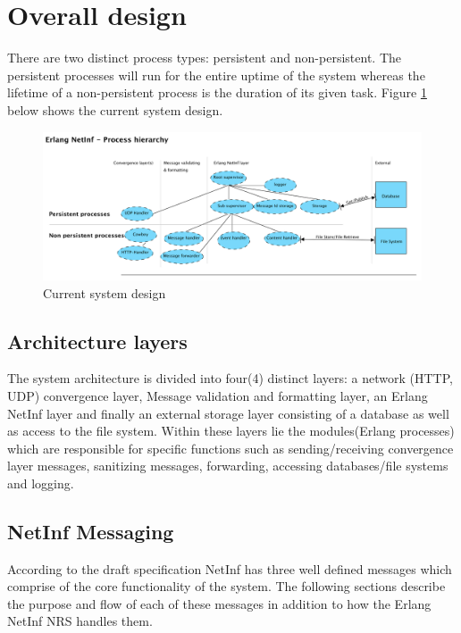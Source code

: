 \section {Overall design}

There are two distinct process types: persistent and non-persistent. The persistent processes will run for the entire uptime of the system whereas the lifetime of a non-persistent process is the duration of its given task. Figure \ref{fig:processhi} below shows the current system design.

\begin{figure}[H]
	\centering
\centerline{\includegraphics[width=1.2\textwidth]{./img/process_hierarchy.png}}
\caption{Current system design}
\label{fig:processhi}
\end{figure}

\subsection{Architecture layers}

The system architecture is divided into four(4) distinct layers: a network (HTTP, UDP) convergence layer, Message validation and formatting layer, an Erlang NetInf layer and finally an external storage layer consisting of a database as well as access to the file system. Within these layers lie the modules(Erlang processes) which are responsible for specific functions such as sending/receiving convergence layer messages, sanitizing messages, forwarding, accessing databases/file systems and logging.

\subsection{NetInf Messaging}

According to the draft specification\cite{netinfproto} NetInf has three well defined messages which comprise of the core functionality of the system. The following sections describe the purpose and flow of each of these messages in addition to how the Erlang NetInf NRS handles them.

